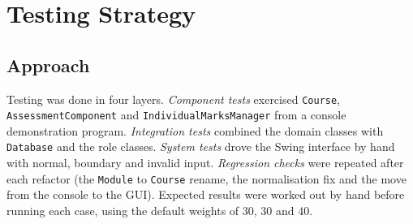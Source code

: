 \section{Testing Strategy}\label{sec:testing}

\subsection{Approach}
Testing was done in four layers. \emph{Component tests} exercised \texttt{Course}, \texttt{AssessmentComponent} and \texttt{IndividualMarksManager} from a console demonstration program. \emph{Integration tests} combined the domain classes with \texttt{Database} and the role classes. \emph{System tests} drove the Swing interface by hand with normal, boundary and invalid input. \emph{Regression checks} were repeated after each refactor (the \texttt{Module} to \texttt{Course} rename, the normalisation fix and the move from the console to the GUI). Expected results were worked out by hand before running each case, using the default weights of 30, 30 and 40.

